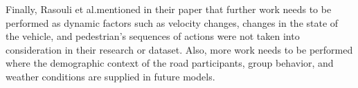 \documentclass[conference, onecolumn]{IEEEtran}
\begin{document}
Finally, Rasouli et al.mentioned in their paper that further work needs to be performed as dynamic factors such as velocity changes, changes in the state of the vehicle, and pedestrian's sequences of actions were not taken into consideration in their research or dataset. Also, more work needs to be performed where the demographic context of the road participants, group behavior, and weather conditions are supplied in future models.





\ \\
%



\end{document}
